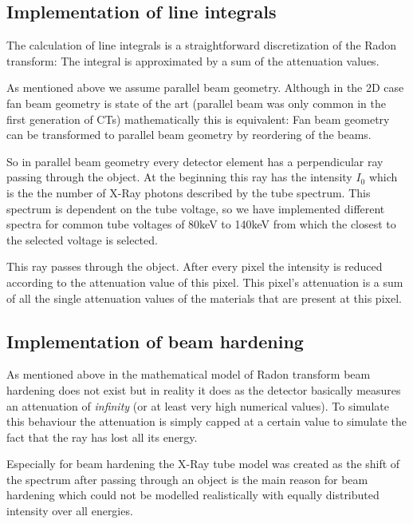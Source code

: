 \subsection{Implementation of line integrals}
\par The calculation of line integrals is a straightforward discretization of the Radon transform: The integral is approximated by a sum of the attenuation values.
\par As mentioned above we assume parallel beam geometry. Although in the 2D case fan beam geometry is state of the art (parallel beam was only common in the first generation of CTs) mathematically this is equivalent: Fan beam geometry can be transformed to parallel beam geometry by reordering of the beams.\cite{IIIP_3_4}
\par So in parallel beam geometry every detector element has a perpendicular ray passing through the object. At the beginning this ray has the intensity \(I_{0}\) which is the the number of X-Ray photons described by the tube spectrum. This spectrum is dependent on the tube voltage, so we have implemented different spectra for common tube voltages of 80keV to 140keV from which the closest to the selected voltage is selected.
\par This ray passes through the object. After every pixel the intensity is reduced according to the attenuation value of this pixel. This pixel's attenuation is a sum of all the single attenuation values of the materials that are present at this pixel.
\subsection{Implementation of beam hardening}
\par As mentioned above in the mathematical model of Radon transform beam hardening does not exist but in reality it does as the detector basically measures an attenuation of \emph{infinity} (or at least very high numerical values). To simulate this behaviour the attenuation is simply capped at a certain value to simulate the fact that the ray has lost all its energy.
\par Especially for beam hardening the X-Ray tube model was created as the shift of the spectrum after passing through an object is the main reason for beam hardening which could not be modelled realistically with equally distributed intensity over all energies.  
